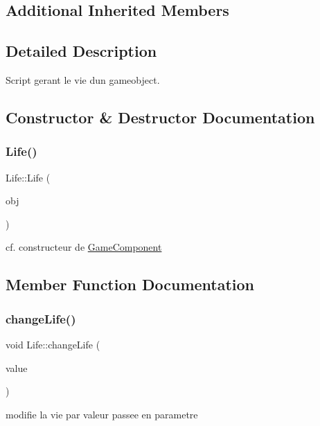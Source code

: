 \subsection*{Additional Inherited Members}


\subsection{Detailed Description}
Script gerant le vie d\textquotesingle{}un gameobject. 

\subsection{Constructor \& Destructor Documentation}
\hypertarget{class_life_ad5a065168648ef6114eee8851c63a9e0}{}\label{class_life_ad5a065168648ef6114eee8851c63a9e0} 
\subsubsection{\texorpdfstring{Life()}{Life()}}
{\footnotesize\ttfamily Life\+::\+Life (\begin{DoxyParamCaption}\item[{\hyperlink{class_game_object}{Game\+Object} $\ast$}]{obj }\end{DoxyParamCaption})}

cf. constructeur de \hyperlink{class_game_component}{Game\+Component} 

\subsection{Member Function Documentation}
\hypertarget{class_life_a5058223a20871cf287b7f75ce2eb44ef}{}\label{class_life_a5058223a20871cf287b7f75ce2eb44ef} 
\subsubsection{\texorpdfstring{change\+Life()}{changeLife()}}
{\footnotesize\ttfamily void Life\+::change\+Life (\begin{DoxyParamCaption}\item[{int}]{value }\end{DoxyParamCaption})\hspace{0.3cm}{\ttfamily [inline]}}



modifie la vie par valeur passee en parametre 


